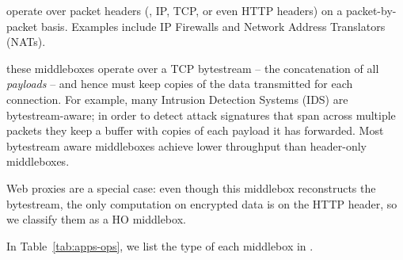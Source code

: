  operate over packet headers (\eg{}, IP, TCP, or even HTTP headers) on a packet-by-packet basis.
Examples  include IP Firewalls and Network Address Translators (NATs). 

 these middleboxes operate over a TCP bytestream -- the concatenation of all {\it payloads} -- and hence must keep copies of the data transmitted for each connection.
  For example, many Intrusion Detection Systems (IDS) are bytestream-aware; in order to detect attack signatures that span across multiple packets they keep a buffer  with copies of each payload it has forwarded.
Most bytestream aware middleboxes achieve lower throughput than header-only middleboxes.

 Web proxies are a special case: even though this middlebox reconstructs the bytestream, the only computation on encrypted data is on the HTTP header, so we classify them as a HO middlebox. 
 
 
  
 
 

 
 
  In Table~\ref{tab:apps-ops}, we list the type of each  middlebox in \sys. 
  
